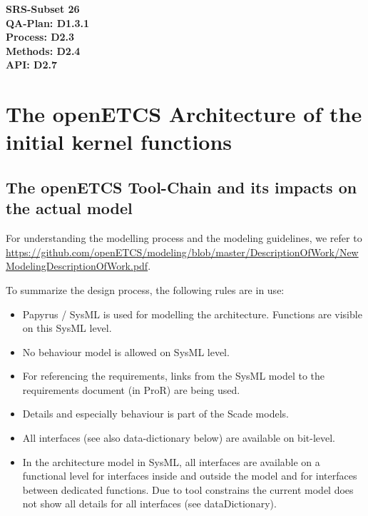 \documentclass{template/openetcs_article}
\begin{document}
\textbf{SRS-Subset 26}\\
\textbf{QA-Plan: D1.3.1}\\
\textbf{Process: D2.3}\\
\textbf{Methods: D2.4}\\
\textbf{API: D2.7}\\

\section{The openETCS Architecture of the initial kernel functions}

\subsection{The openETCS Tool-Chain and its impacts on the actual model}

For understanding the modelling process and the modeling guidelines, we refer to \url{https://github.com/openETCS/modeling/blob/master/DescriptionOfWork/NewModelingDescriptionOfWork.pdf}.

To summarize the design process, the following rules are in use:
\begin{itemize}
\item Papyrus / SysML is used for modelling the architecture. Functions are visible on this SysML level.
\item No behaviour model is allowed on SysML level.
\item For referencing the requirements, links from the SysML model to the requirements document (in ProR) are being used.
\item Details and especially behaviour is part of the Scade models.
\item All interfaces (see also data-dictionary below) are available on bit-level.
\item In the architecture model in SysML, all interfaces are available on a functional level for interfaces inside and outside the model and for interfaces between dedicated functions. Due to tool constrains the current model does not show all details for all interfaces (see dataDictionary).
\end{itemize}
\end{document}
